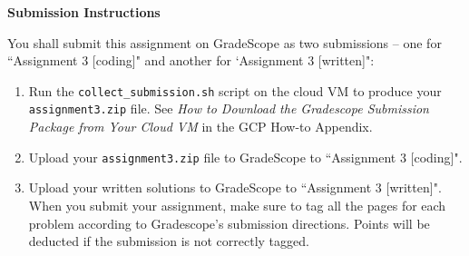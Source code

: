 \Large{\textbf{Submission Instructions}}

\normalsize
You shall submit this assignment on GradeScope as two submissions -- one for ``Assignment 3 [coding]" and another for `Assignment 3 [written]":
\begin{enumerate}
    \item Run the \texttt{collect\_submission.sh} script on the cloud VM to produce your \texttt{assignment3.zip} file. See \emph{How to Download the Gradescope Submission Package from Your Cloud VM} in the GCP How-to Appendix.
    \item Upload your \texttt{assignment3.zip} file to GradeScope to ``Assignment 3 [coding]".
    \item Upload your written solutions to GradeScope to ``Assignment 3 [written]". When you submit your assignment, make sure to tag all the pages for each problem according to Gradescope's submission directions. Points will be deducted if the submission is not correctly tagged.
\end{enumerate}